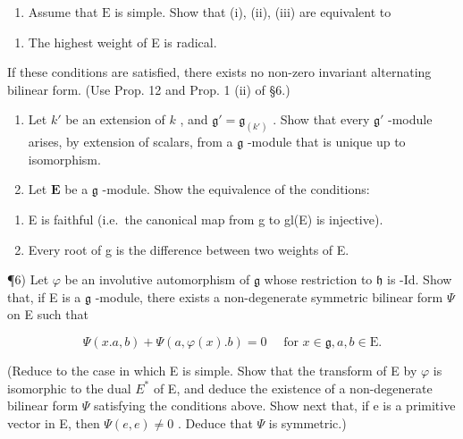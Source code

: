 \begin{enumerate}
\def\labelenumi{\alph{enumi})}
\setcounter{enumi}{1}
\tightlist
\item
  Assume that \(\mathrm{E}\) is simple. Show that (i), (ii), (iii) are equivalent to
\end{enumerate}

\begin{enumerate}
\def\labelenumi{(\roman{enumi})}
\setcounter{enumi}{3}
\tightlist
\item
  The highest weight of E is radical.
\end{enumerate}

If these conditions are satisfied, there exists no non-zero invariant alternating bilinear form. (Use Prop. 12 and Prop. 1 (ii) of §6.)

\begin{enumerate}
\def\labelenumi{\arabic{enumi})}
\setcounter{enumi}{3}
\item
  Let \(k'\) be an extension of \(k\) , and \(\mathfrak{g}' = \mathfrak{g}_{(k')}\) . Show that every \(\mathfrak{g}'\) -module arises, by extension of scalars, from a \(\mathfrak{g}\) -module that is unique up to isomorphism.
\item
  Let \(\mathbf{E}\) be a \(\mathfrak{g}\) -module. Show the equivalence of the conditions:
\end{enumerate}

\begin{enumerate}
\def\labelenumi{(\roman{enumi})}
\item
  E is faithful (i.e.~the canonical map from g to gl(E) is injective).
\item
  Every root of g is the difference between two weights of E.
\end{enumerate}

¶6) Let \(\varphi\) be an involutive automorphism of \(\mathfrak{g}\) whose restriction to \(\mathfrak{h}\) is -Id. Show that, if E is a \(\mathfrak{g}\) -module, there exists a non-degenerate symmetric bilinear form \(\varPsi\) on E such that

\[
\varPsi (x. a, b) + \varPsi (a, \varphi (x). b) = 0 \quad \text {   for   } x \in \mathfrak {g}, a, b \in \mathrm{E}.
\]

(Reduce to the case in which E is simple. Show that the transform of E by \(\varphi\) is isomorphic to the dual \(E^{*}\) of E, and deduce the existence of a non-degenerate bilinear form \(\Psi\) satisfying the conditions above. Show next that, if e is a primitive vector in E, then \(\Psi(e,e)\neq0\) . Deduce that \(\Psi\) is symmetric.)

